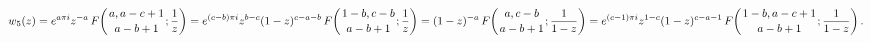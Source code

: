 \[w_{5}(z)=e^{a\pi i}z^{-a}\*\mathop{F\/}\nolimits\!\left({a,a-c+1\atop a-b+1};%
\frac{1}{z}\right)=e^{(c-b)\pi i}z^{b-c}(1-z)^{c-a-b}\*\mathop{F\/}\nolimits\!%
\left({1-b,c-b\atop a-b+1};\frac{1}{z}\right)=(1-z)^{-a}\mathop{F\/}\nolimits%
\!\left({a,c-b\atop a-b+1};\frac{1}{1-z}\right)=e^{(c-1)\pi i}z^{1-c}(1-z)^{c-%
a-1}\*\mathop{F\/}\nolimits\!\left({1-b,a-c+1\atop a-b+1};\frac{1}{1-z}\right).\]